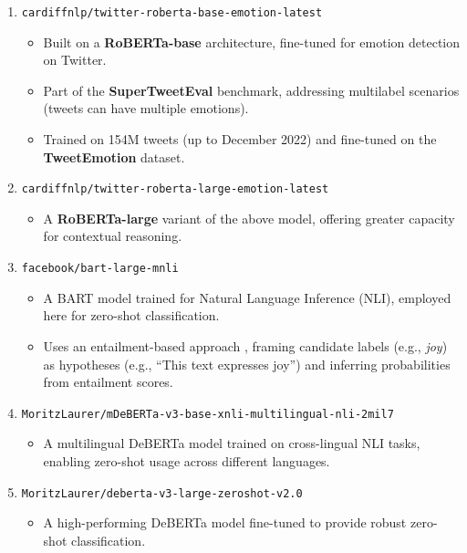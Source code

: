 \begin{enumerate}
    \item \texttt{cardiffnlp/twitter-roberta-base-emotion-latest} \cite{antypas2023supertweetevalchallengingunifiedheterogeneous}
    \begin{itemize}
        \item Built on a \textbf{RoBERTa-base} architecture, fine-tuned for emotion detection on Twitter.
        \item Part of the \textbf{SuperTweetEval} benchmark, addressing multilabel scenarios (tweets can have multiple emotions).
        \item Trained on 154M tweets (up to December 2022) and fine-tuned on the \textbf{TweetEmotion} dataset.
    \end{itemize}
    
    \item \texttt{cardiffnlp/twitter-roberta-large-emotion-latest} \cite{antypas2023supertweetevalchallengingunifiedheterogeneous}
    \begin{itemize}
        \item A \textbf{RoBERTa-large} variant of the above model, offering greater capacity for contextual reasoning.
    \end{itemize}
    
    \item \texttt{facebook/bart-large-mnli} \cite{lewis2019bartdenoisingsequencetosequencepretraining}
    \begin{itemize}
        \item A BART model trained for Natural Language Inference (NLI), employed here for zero-shot classification.
        \item Uses an entailment-based approach \cite{DBLP:journals/corr/abs-1909-00161}, framing candidate labels (e.g., \textit{joy}) as hypotheses (e.g., “This text expresses joy”) and inferring probabilities from entailment scores.
    \end{itemize}
    
    \item \texttt{MoritzLaurer/mDeBERTa-v3-base-xnli-multilingual-nli-2mil7} \cite{laurer_less_2022}
    \begin{itemize}
        \item A multilingual DeBERTa model trained on cross-lingual NLI tasks, enabling zero-shot usage across different languages.
    \end{itemize}
    
    \item \texttt{MoritzLaurer/deberta-v3-large-zeroshot-v2.0} \cite{laurer_building_2023}
    \begin{itemize}
        \item A high-performing DeBERTa model fine-tuned to provide robust zero-shot classification.
    \end{itemize}
\end{enumerate}

